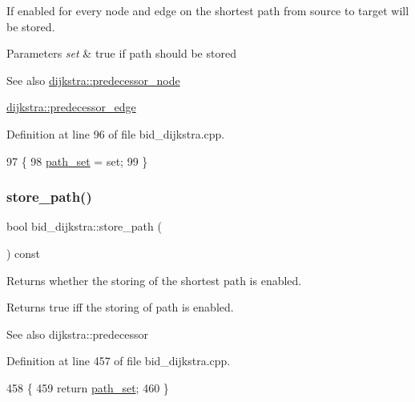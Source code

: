 If enabled for every node and edge on the shortest path from source to target will be stored.


\begin{DoxyParams}{Parameters}
{\em set} & true if path should be stored\\
\hline
\end{DoxyParams}
\begin{DoxySeeAlso}{See also}
\mbox{\hyperlink{classdijkstra_a99c17ee7c2b55574ea8c2952fac09faf}{dijkstra\+::predecessor\+\_\+node}} 

\mbox{\hyperlink{classdijkstra_aa3ef1a7d7dfc33e4a39aff309f873929}{dijkstra\+::predecessor\+\_\+edge}} 
\end{DoxySeeAlso}


Definition at line 96 of file bid\+\_\+dijkstra.\+cpp.


\begin{DoxyCode}
97 \{
98     \mbox{\hyperlink{classbid__dijkstra_aa7b329f69600fffae2753f87501dab9d}{path\_set}} = \textcolor{keyword}{set};
99 \}
\end{DoxyCode}
\mbox{\label{classbid__dijkstra_ad9716d8f542f07e5696aba778417cc12}} 
\subsubsection{\texorpdfstring{store\+\_\+path()}{store\_path()}\hspace{0.1cm}{\footnotesize\ttfamily [2/2]}}
{\footnotesize\ttfamily bool bid\+\_\+dijkstra\+::store\+\_\+path (\begin{DoxyParamCaption}{ }\end{DoxyParamCaption}) const}



Returns whether the storing of the shortest path is enabled. 

\begin{DoxyReturn}{Returns}
{\ttfamily true} iff the storing of path is enabled.
\end{DoxyReturn}
\begin{DoxySeeAlso}{See also}
dijkstra\+::predecessor 
\end{DoxySeeAlso}


Definition at line 457 of file bid\+\_\+dijkstra.\+cpp.


\begin{DoxyCode}
458 \{
459     \textcolor{keywordflow}{return} \mbox{\hyperlink{classbid__dijkstra_aa7b329f69600fffae2753f87501dab9d}{path\_set}};
460 \}
\end{DoxyCode}
\mbox{\label{classbid__dijkstra_a5d32d74a93c1be5581f56ba3a2839ff5}} 
